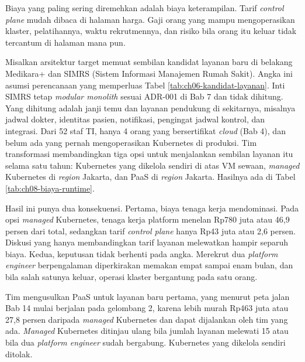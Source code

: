 Biaya yang paling sering diremehkan adalah biaya keterampilan. Tarif \textit{control plane} mudah
dibaca di halaman harga. Gaji orang yang mampu mengoperasikan klaster, pelatihannya, waktu
rekrutmennya, dan risiko bila orang itu keluar tidak tercantum di halaman mana pun.

\begin{kasus}[title={Kasus Medikara Health: Sanggupkah Tim TI Mengelola Kubernetes?}]
  Misalkan arsitektur target memuat sembilan kandidat layanan baru di belakang Medikara+ dan
  SIMRS (Sistem Informasi Manajemen Rumah Sakit). Angka ini asumsi perencanaan yang memperluas
  Tabel \ref{tab:ch06-kandidat-layanan}. Inti SIMRS tetap \textit{modular monolith} sesuai ADR-001
  di Bab 7 dan tidak dihitung. Yang dihitung adalah janji temu dan layanan pendukung di sekitarnya,
  misalnya jadwal dokter, identitas pasien, notifikasi, pengingat jadwal kontrol, dan integrasi.
  Dari 52 staf TI, hanya 4 orang yang
  bersertifikat \textit{cloud} (Bab 4), dan belum ada yang pernah mengoperasikan Kubernetes di
  produksi. Tim transformasi membandingkan tiga opsi untuk menjalankan sembilan layanan itu selama
  satu tahun: Kubernetes yang dikelola sendiri di atas VM sewaan, \textit{managed} Kubernetes di
  \textit{region} Jakarta, dan PaaS di \textit{region} Jakarta. Hasilnya ada di Tabel
  \ref{tab:ch08-biaya-runtime}.

  Hasil ini punya dua konsekuensi. Pertama, biaya tenaga kerja mendominasi. Pada opsi
  \textit{managed} Kubernetes, tenaga kerja platform menelan Rp780 juta atau 46,9 persen dari
  total, sedangkan tarif \textit{control plane} hanya Rp43 juta atau 2,6 persen. Diskusi yang hanya
  membandingkan tarif layanan melewatkan hampir separuh biaya. Kedua, keputusan tidak berhenti
  pada angka. Merekrut dua \textit{platform engineer} berpengalaman diperkirakan memakan empat
  sampai enam bulan, dan bila salah satunya keluar, operasi klaster bergantung pada satu orang.

  Tim mengusulkan PaaS untuk layanan baru pertama, yang menurut peta jalan Bab 14 mulai berjalan
  pada gelombang 2, karena lebih murah Rp463 juta atau 27,8 persen
  daripada \textit{managed} Kubernetes dan dapat dijalankan oleh tim yang ada. \textit{Managed}
  Kubernetes ditinjau ulang bila jumlah layanan melewati 15 atau bila dua \textit{platform
  engineer} sudah bergabung. Kubernetes yang dikelola sendiri ditolak.
\end{kasus}

